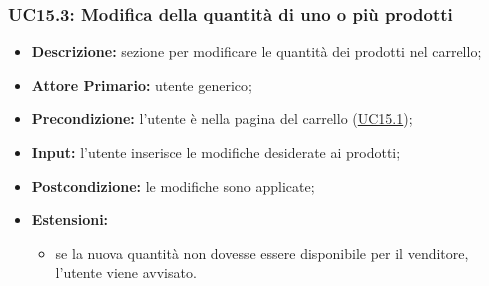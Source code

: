         \subsubsection{UC15.3: Modifica della quantità di uno o più prodotti}
        \begin{itemize}
            \item \textbf{Descrizione:} sezione per modificare le quantità dei prodotti nel carrello;
            \item \textbf{Attore Primario:} utente generico;
            \item \textbf{Precondizione:} l'utente è nella pagina del carrello (\hyperref[sec:UC15.1]{UC15.1});
            \item \textbf{Input:} l'utente inserisce le modifiche desiderate ai prodotti;
            \item \textbf{Postcondizione:} le modifiche sono applicate;
            \item \textbf{Estensioni:} 
                \begin{itemize}
                    \item se la nuova quantità non dovesse essere disponibile per il venditore, l'utente viene avvisato.
                \end{itemize}
        \end{itemize}

        
